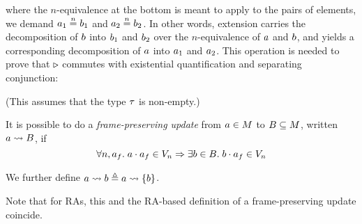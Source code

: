 \begin{center}
\end{center}
where the $n$-equivalence at the bottom is meant to apply to the pairs of elements, \ie we demand $a_1 \mathrel{\stackrel{n}{=}} b_1$ and $a_2 \mathrel{\stackrel{n}{=}} b_2$.
In other words, extension carries the decomposition of $b$ into $b_1$ and $b_2$ over the $n$-equivalence of $a$ and $b$, and yields a corresponding decomposition of $a$ into $a_1$ and $a_2$.
This operation is needed to prove that $\mathord{\triangleright}$ commutes with existential quantification and separating conjunction:
(This assumes that the type $\tau$ is non-empty.)


\begin{defn}
  It is possible to do a \emph{frame-preserving update} from $a \in M$ to $B \subseteq M$, written $a \rightsquigarrow B$, if
  \[ \All n, \melt_f. \melt \mtimes \melt_f \in \mval_n \Ra \Exists \meltB \in \meltsB. \meltB \mtimes \melt_f \in \mval_n \]

  We further define $a \rightsquigarrow b \triangleq a \rightsquigarrow \left\{b\right\}$.
\end{defn}

Note that for RAs, this and the RA-based definition of a frame-preserving update coincide.


